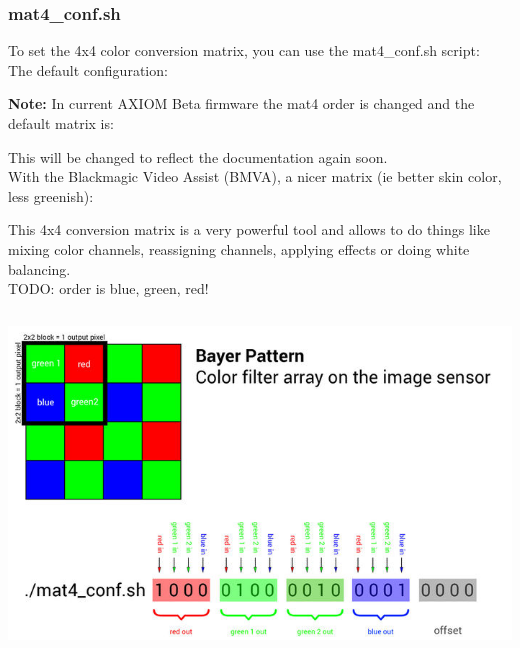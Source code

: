 \subsubsection{mat4\_conf.sh}

To set the 4x4 color conversion matrix, you can use the mat4\_conf.sh script:\\

The default configuration: 


\textbf{Note:} In current AXIOM Beta firmware the mat4 order is changed and the default matrix is: 


This will be changed to reflect the documentation again soon.\\

With the Blackmagic Video Assist (BMVA), a nicer matrix (ie better skin color, less greenish): 


This 4x4 conversion matrix is a very powerful tool and allows to do things like mixing color channels, reassigning channels, applying effects or doing white balancing.\\

TODO: order is blue, green, red! 

\begin{center}
\includegraphics[height=9cm]{images/700px-Mat4-conf-illustration-01}
\end{center}

